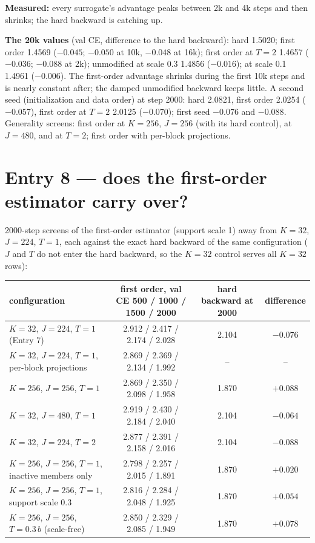 \documentclass[11pt,a4paper]{article}
\begin{document}
\textbf{Measured:} every surrogate's advantage peaks between 2k and 4k steps and then shrinks; the hard backward is
catching up.

\textbf{The 20k values} (val CE, difference to the hard backward): hard 1.5020; first order 1.4569 (\(-0.045\); \(-0.050\)
at 10k, \(-0.048\) at 16k); first order at \(T=2\) 1.4657 (\(-0.036\); \(-0.088\) at 2k); unmodified at scale 0.3 1.4856
(\(-0.016\)); at scale 0.1 1.4961 (\(-0.006\)).  The first-order advantage shrinks during the first 10k steps and is
nearly constant after; the damped unmodified backward keeps little.  A second seed (initialization and data order)
at step 2000: hard 2.0821, first order 2.0254 (\(-0.057\)), first order at \(T=2\) 2.0125 (\(-0.070\)); first seed
\(-0.076\) and \(-0.088\).  Generality screens: first order at \(K=256\), \(J=256\) (with its hard
control), at \(J=480\), and at \(T=2\); first order with per-block projections.

\section{Entry 8 --- does the first-order estimator carry over?}

2000-step screens of the first-order estimator (support scale 1) away from \(K=32\), \(J=224\), \(T=1\), each against
the exact hard backward of the same configuration (\(J\) and \(T\) do not enter the hard backward, so the
\(K=32\) control serves all \(K=32\) rows):

\begin{center}\small
\begin{tabular}{lccc}
\toprule
configuration & first order, val CE 500 / 1000 / 1500 / 2000 & hard backward at 2000 & difference \\
\midrule
\(K=32\), \(J=224\), \(T=1\) (Entry 7)      & 2.912 / 2.417 / 2.174 / 2.028 & 2.104 & \(-0.076\) \\
\(K=32\), \(J=224\), \(T=1\), per-block projections & 2.869 / 2.369 / 2.134 / 1.992 & -- & -- \\
\(K=256\), \(J=256\), \(T=1\)               & 2.869 / 2.350 / 2.098 / 1.958 & 1.870 & \(+0.088\) \\
\(K=32\), \(J=480\), \(T=1\)                & 2.919 / 2.430 / 2.184 / 2.040 & 2.104 & \(-0.064\) \\
\(K=32\), \(J=224\), \(T=2\)                & 2.877 / 2.391 / 2.158 / 2.016 & 2.104 & \(-0.088\) \\
\(K=256\), \(J=256\), \(T=1\), inactive members only & 2.798 / 2.257 / 2.015 / 1.891 & 1.870 & \(+0.020\) \\
\(K=256\), \(J=256\), \(T=1\), support scale 0.3 & 2.816 / 2.284 / 2.048 / 1.925 & 1.870 & \(+0.054\) \\
\(K=256\), \(J=256\), \(T=0.3\,b\) (scale-free) & 2.850 / 2.329 / 2.085 / 1.949 & 1.870 & \(+0.078\) \\
\bottomrule
\end{tabular}
\end{center}
\end{document}
